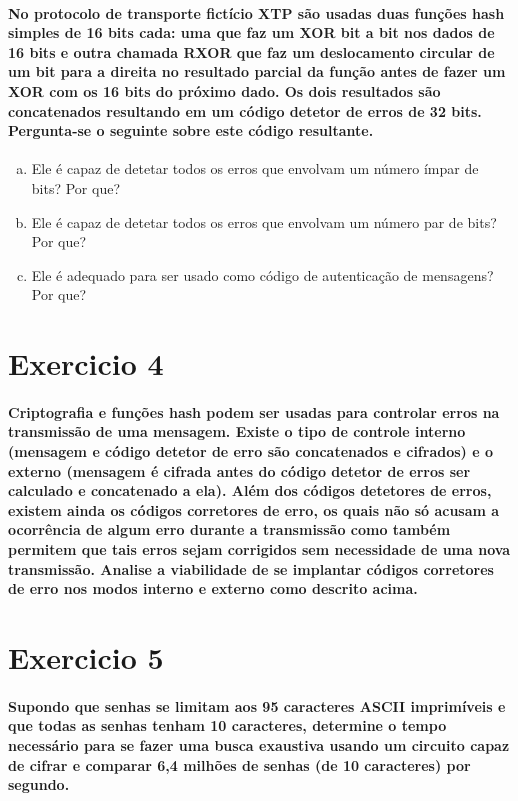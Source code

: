 \documentclass[10pt,a4paper]{report}
\begin{document}
\paragraph{ No protocolo de transporte fictício XTP são usadas duas funções hash simples de 16 bits cada: uma que faz um XOR bit a bit nos dados de 16 bits e outra chamada RXOR que faz um deslocamento circular de um bit para a direita no resultado parcial da função antes de fazer um XOR com os 16 bits do próximo dado. Os dois resultados são concatenados resultando em um código detetor de erros de 32 bits. Pergunta-se o seguinte sobre este código resultante.}
\begin{enumerate}[(a)]
\item Ele é capaz de detetar todos os erros que envolvam um número ímpar de bits? Por que?
\item Ele é capaz de detetar todos os erros que envolvam um número par de bits? Por que?
\item Ele é adequado para ser usado como código de autenticação de mensagens? Por que?
\end{enumerate}

\section*{Exercicio 4}
\paragraph{ Criptografia e funções hash podem ser usadas para controlar erros na transmissão de uma mensagem. Existe o tipo de controle interno (mensagem e código detetor de erro são concatenados e cifrados) e o externo (mensagem é cifrada antes do código detetor de erros ser calculado e concatenado a ela). Além dos códigos detetores de erros, existem ainda os códigos corretores de erro, os quais não só acusam a ocorrência de algum erro durante a transmissão como também permitem que tais erros sejam corrigidos sem necessidade de uma nova transmissão. Analise a viabilidade de se implantar códigos corretores de erro nos modos interno e externo como descrito acima.}
\section*{Exercicio 5}
\paragraph{ Supondo que senhas se limitam aos 95 caracteres ASCII imprimíveis e que todas as senhas tenham 10 caracteres, determine o tempo necessário para se fazer uma busca exaustiva usando um circuito capaz de cifrar e comparar 6,4 milhões de senhas (de 10 caracteres) por segundo.}
\end{document}
